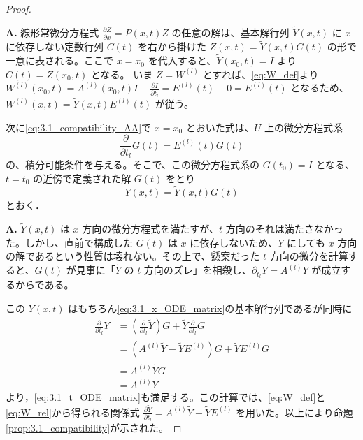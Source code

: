 \begin{story}
\begin{proof}
\begin{Q}
\textbf{A.} 線形常微分方程式 $\frac{\partial Z}{\partial x} = P(x,t)Z$ の任意の解は、基本解行列 $\tilde{Y}(x,t)$ に $x$ に依存しない定数行列 $C(t)$ を右から掛けた $Z(x,t) = \tilde{Y}(x,t)C(t)$ の形で一意に表される。ここで $x=x_0$ を代入すると、$\tilde{Y}(x_0,t) = I$ より $C(t) = Z(x_0,t)$ となる。
いま $Z = W^{(l)}$ とすれば、\eqref{eq:W_def}より
$W^{(l)}(x_0,t) = A^{(l)}(x_0,t)I - \frac{\partial I}{\partial t_l} = E^{(l)}(t) - 0 = E^{(l)}(t)$ 
となるため、$W^{(l)}(x,t) = \tilde{Y}(x,t)E^{(l)}(t)$ が従う。
\end{Q}

次に\eqref{eq:3.1_compatibility_AA}で $x=x_0$ とおいた式は、$U$ 上の微分方程式系
\[
  \frac{\partial}{\partial t_l}G(t) = E^{(l)}(t)G(t)
\]
の、積分可能条件を与える。そこで、この微分方程式系の $G(t_0)=I$ となる、$t=t_0$ の近傍で定義された解 $G(t)$ をとり
\[
  Y(x,t) = \tilde{Y}(x,t)G(t)
\]
とおく．

\begin{Q}[$Y(x,t) = \tilde{Y}(x,t)G(t)$ とおくことで、なぜ所望の可逆行列解が構成できたと言えるのか？]
\textbf{A.} $\tilde{Y}(x,t)$ は $x$ 方向の微分方程式を満たすが、$t$ 方向のそれは満たさなかった。しかし、直前で構成した $G(t)$ は $x$ に依存しないため、$Y$ にしても $x$ 方向の解であるという性質は壊れない。その上で、懸案だった $t$ 方向の微分を計算すると、$G(t)$ が見事に「$\tilde{Y}$ の $t$ 方向のズレ」を相殺し、$\partial_{t_l}Y = A^{(l)}Y$ が成立するからである。
\end{Q}

この $Y(x,t)$ はもちろん\eqref{eq:3.1_x_ODE_matrix}の基本解行列であるが同時に
\begin{align*}
  \frac{\partial}{\partial t_l}Y 
  &= \left( \frac{\partial}{\partial t_l}\tilde{Y} \right)G + \tilde{Y}\frac{\partial}{\partial t_l}G \\[2mm]
  &= \left( A^{(l)}\tilde{Y} - \tilde{Y}E^{(l)} \right)G + \tilde{Y}E^{(l)}G \\[2mm]
  &= A^{(l)}\tilde{Y}G \\[2mm]
  &= A^{(l)}Y
\end{align*}
より，\eqref{eq:3.1_t_ODE_matrix}も満足する。この計算では、\eqref{eq:W_def}と\eqref{eq:W_rel}から得られる関係式 $\frac{\partial \tilde{Y}}{\partial t_l} = A^{(l)}\tilde{Y} - \tilde{Y}E^{(l)}$ を用いた。以上により命題\ref{prop:3.1_compatibility}が示された。
\end{proof}

\end{story} 


